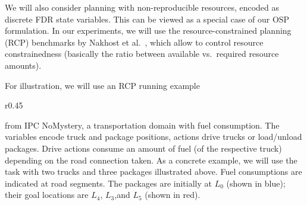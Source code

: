 %
%
We will also consider planning with non-reproducible resources,
encoded as discrete FDR state variables. This can be viewed as a
special case of our OSP formulation. In our experiments, we will use
the resource-constrained planning (RCP) benchmarks by Nakhost et
al.\ , which allow to control
resource constrainedness (basically the ratio between available
vs.\ required resource amounts).

For illustration, we will use an RCP running example 
%
\begin{wrapfigure}{r}{0.45\columnwidth}
\vspace{-0.3cm} \hspace{-0.8cm} %
\vspace{-0.5cm}
\end{wrapfigure}
%
from IPC NoMystery, a transportation domain with fuel consumption.
The variables encode truck and package positions, actions drive trucks
or load/unload packages. Drive actions consume an amount of fuel (of
the respective truck) depending on the road connection taken. As a
concrete example, we will use the task with two trucks and three
packages illustrated above. Fuel consumptions are indicated at road
segments. The packages are initially at $L_0$ (shown in blue); their
goal locations are $L_4$, $L_3$,and $L_5$ (shown in red).

